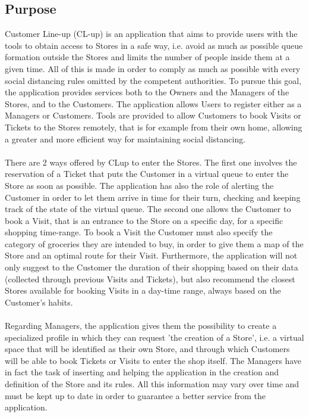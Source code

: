 \documentclass[a4paper, 12pt, oneside]{article}
\begin{document}
\subsection{Purpose}
\label{intro:purpose}
Customer Line-up (CL-up) is an application that aims to provide users with the tools to obtain access to Stores in a safe way, i.e. avoid as much as possible queue formation outside the Stores and limits the number of people inside them at a given time. All of this is made in order to comply as much as possible with every social distancing rules omitted by the competent authorities. To pursue this goal, the application provides services both to the Owners and the Managers of the Stores, and to the Customers. The application allows Users to register either as a Managers or Customers. Tools are provided to allow Customers to book Visits or Tickets to the Stores remotely, that is for example from their own home, allowing a greater and more efficient way for maintaining social distancing.\\
\\
There are 2 ways offered by CLup to enter the Stores. The first one involves the reservation of a Ticket that puts the Customer in a virtual queue to enter the Store as soon as possible. The application has also the role of alerting the Customer in order to let them arrive in time for their turn, checking and keeping track of the state of the virtual queue. The second one allows the Customer to book a Visit, that is an entrance to the Store on a specific day, for a specific shopping time-range. To book a Visit the Customer must also specify the category of groceries they are intended to buy, in order to give them a map of the Store and an optimal route for their Visit. Furthermore, the application will not only suggest to the Customer the duration of their shopping based on their data (collected through previous Visits and Tickets), but also recommend the closest Stores available for booking Visits in a day-time range, always based on the Customer's habits.\\
\\
Regarding Managers, the application gives them the possibility to create a specialized profile in which they can request 'the creation of a Store', i.e. a virtual space that will be identified as their own Store, and through which Customers will be able to book Tickets or Visits to enter the shop itself. The Managers have in fact the task of inserting and helping the application in the creation and definition of the Store and its rules. All this information may vary over time and must be kept up to date in order to guarantee a better service from the application.\\
\end{document}
